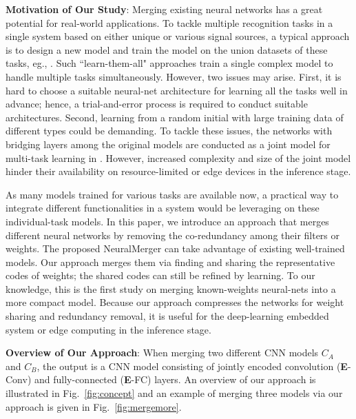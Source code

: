 \documentclass{article}
\begin{document}
	
	\vspace{0.2cm}
	\noindent \textbf{Motivation of Our Study}:
	Merging existing neural networks has a great potential for real-world applications.
	To tackle multiple recognition tasks in a single system based on either unique or various signal sources, a typical approach is to design a new model and train the model on the union datasets of these tasks, eg., \cite{DBLP:journals/corr/KaiserGSVPJU17,DBLP:journals/corr/AytarVT17}.
	Such ``learn-them-all" approaches train a single complex model to handle multiple tasks simultaneously.
	However, two issues may arise.
	First, it is hard to choose a suitable neural-net architecture for learning all the tasks well in advance;
	hence, a trial-and-error process is required to conduct suitable architectures.
	Second, learning from a random initial with large training data of different types could be demanding.
	To tackle these issues, the networks with bridging layers among the original models are conducted as a joint model for multi-task learning in \cite{RN274_multitask}.
	However, increased complexity and size of the joint model hinder their availability on resource-limited or edge devices in the inference stage.
	
	As many models trained for various tasks are available now, a practical way to integrate different functionalities in a system would be leveraging on these individual-task models.
	In this paper, we introduce an approach that merges different neural networks by removing the co-redundancy among their filters or weights.
	The proposed NeuralMerger can take advantage of existing well-trained models.
	Our approach merges them %
	via finding and sharing the representative codes of weights;
	the shared codes can still be refined by learning.
	To our knowledge, this is the first study on merging known-weights neural-nets into a more compact model. %
	Because our approach compresses the networks for weight sharing and redundancy removal, it is useful %
	for the deep-learning embedded system or edge computing in the inference stage.
	
	
	
	\vspace{0.15cm}
	\noindent \textbf{Overview of Our Approach}:
	When merging two different CNN models $C_A$ and $C_B$, the output is a CNN model consisting of jointly encoded convolution (\textbf{E}-Conv) and fully-connected (\textbf{E}-FC) layers.
	An overview of our approach is illustrated in Fig.~\ref{fig:concept} and an example of merging three models via our approach is given in Fig.~\ref{fig:mergemore}.
	
\end{document}
